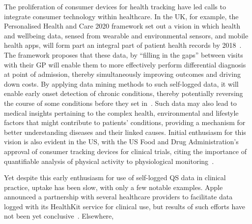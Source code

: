 \documentclass{sigchi}
\begin{document}
The proliferation of consumer devices for health tracking have led calls to integrate consumer technology within healthcare. In the UK, for example, the Personalised Health and Care 2020 framework set out a vision in which health and wellbeing data, sensed from wearable and environmental sensors, and mobile health apps, will form part an integral part of patient health records by 2018~\cite{Personalised2014}.  The framework proposes that these data, by ``filling in the gaps'' between visits with their GP will enable them to more effectively perform differential diagnosis at point of admission, thereby simultaneously improving outcomes and driving down costs.  By applying data mining methods to such self-logged data, it will enable early onset detection of chronic conditions, thereby potentially reversing the course of some conditions before they set in~\cite{Swan2009}.  Such data may also lead to medical insights pertaining to the complex health, environmental and lifestyle factors that might contribute to patients' conditions, providing a mechanism for better understanding diseases and their linked causes.  Initial enthusiasm for this vision is also evident in the US, with the US Food and Drug Administration's approval of  consumer tracking devices for clinical trials, citing the importance of quantifiable analysis of physical activity to physiological monitoring~\cite{U.S.FoodandDrugAdministration2014}.

Yet despite this early enthusiasm for use of self-logged QS data in clinical practice, uptake has been slow, with only a few notable examples. Apple announced a partnership with several healthcare providers to facilitate data logged with its HealthKit service for clinical use, but results of such efforts have not been yet conclusive~\cite{}. Elsewhere,


\end{document}
